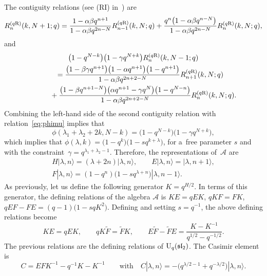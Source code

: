\documentclass[10pt,a4paper]{amsart}
\numberwithin{equation}{section}
\theoremstyle{definition}
\begin{document}
The contiguity relations (see (RI) in~\cite{contiguity}) are
\[
R^{(q{\rm R})}_n(k,N+1;q)=\frac{1-\alpha\beta q^{n+1}}{1-\alpha\beta q^{2n-N}}R^{(q{\rm R})}_{n-1}(k,N;q)+\frac{q^n\bigl(1-\alpha\beta q^{n-N}\bigr)}{1-\alpha\beta q^{2n-N}}R^{(q{\rm R})}_n(k,N;q),
\]
and
\begin{gather*}
\bigl(1-q^{N-k}\bigr)\bigl(1-\gamma q^{N+k}\bigr)R^{(q{\rm R})}_n(k,N-1;q)\\
\qquad=\frac{\bigl(1-\beta\gamma q^{n+1}\bigr)\bigl(1-\alpha q^{n+1}\bigr)\bigl(1-q^{n+1}\bigr)}{1-\alpha\beta q^{2n+2-N}}R^{(q{\rm R})}_{n+1}(k,N;q)\\
\phantom{\qquad=}{}+\frac{\bigl(1-\beta q^{n+1-N}\bigr)\bigl(\alpha q^{n+1}-\gamma q^N\bigr)\bigl(1-q^{N-n}\bigr)}{1-\alpha\beta q^{2n+2-N}}R^{(q{\rm R})}_n(k,N;q).
\end{gather*}
Combining the left-hand side of the second contiguity relation with relation~\eqref{eq:phimu} implies that
\[\phi(\lambda_1+\lambda_2+2k,N-k)=\bigl(1-q^{N-k}\bigr)\bigl(1-\gamma q^{N+k}\bigr),\]
which implies that
$\phi(\lambda,k)=\bigl(1-q^k\bigr)\bigl(1-s q^{k+\lambda}\bigr)$,
for a~free parameter $s$ and with the constraint~${\gamma=q^{\lambda_1+\lambda_2-1}}$.
Therefore, the representations of~$\mathcal{A}$ are
\begin{gather*}
H|\lambda,n\rangle=(\lambda+2n)|\lambda,n\rangle, \qquad
E|\lambda,n\rangle=|\lambda,n+1\rangle, \\
F|\lambda,n\rangle=(1-q^n)\bigl(1- sq^{\lambda+n}\bigr)|\lambda,n-1\rangle.\end{gather*}
As previously, let us define the following generator $ K=q^{H/2}$.
In terms of this generator, the defining relations of the algebra $\mathcal{A}$ is
$
KE=qEK$, $ qKF=FK$, $ qEF-FE=(q-1)\big(1-sqK^2\big)$.
Defining  and setting $s=q^{-1}$, the above defining relations become
\[
 KE=qEK, \qquad qK\widetilde{F}=\widetilde{F}K, \qquad E\widetilde{F}-\widetilde{F}E=\frac{K-K^{-1}}{q^{1/2}-q^{-1/2}}.
\]
The previous relations are the defining relations of ${\rm U}_q(\mathfrak{sl}_2)$.
The Casimir element is
\[
 C=EFK^{-1}-q^{-1}K-K^{-1} \qquad \text{with} \quad C|\lambda,n\rangle=-\bigl(q^{\lambda/2-1}+q^{-\lambda/2}\bigr)|\lambda,n\rangle.
\]
\end{document}
